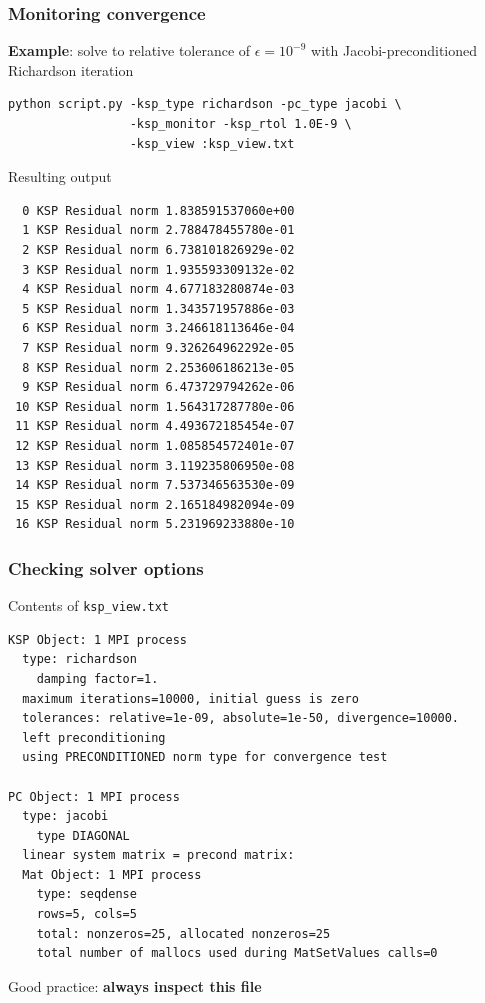 \documentclass{beamer}
\begin{document}
\begin{frame}[fragile]
  \frametitle{Monitoring convergence}
  \textbf{Example}: solve to relative tolerance of $\epsilon=10^{-9}$ with Jacobi-preconditioned Richardson iteration
  \begin{verbatim}
python script.py -ksp_type richardson -pc_type jacobi \
                 -ksp_monitor -ksp_rtol 1.0E-9 \
                 -ksp_view :ksp_view.txt    
  \end{verbatim}
Resulting output
{\tiny
\begin{verbatim}
  0 KSP Residual norm 1.838591537060e+00
  1 KSP Residual norm 2.788478455780e-01
  2 KSP Residual norm 6.738101826929e-02
  3 KSP Residual norm 1.935593309132e-02
  4 KSP Residual norm 4.677183280874e-03
  5 KSP Residual norm 1.343571957886e-03
  6 KSP Residual norm 3.246618113646e-04
  7 KSP Residual norm 9.326264962292e-05
  8 KSP Residual norm 2.253606186213e-05
  9 KSP Residual norm 6.473729794262e-06
 10 KSP Residual norm 1.564317287780e-06
 11 KSP Residual norm 4.493672185454e-07
 12 KSP Residual norm 1.085854572401e-07
 13 KSP Residual norm 3.119235806950e-08
 14 KSP Residual norm 7.537346563530e-09
 15 KSP Residual norm 2.165184982094e-09
 16 KSP Residual norm 5.231969233880e-10
\end{verbatim}}
\end{frame}


\begin{frame}[fragile]
  \frametitle{Checking solver options}
  Contents of \lstinline{ksp_view.txt}
{\footnotesize
\begin{verbatim}  
KSP Object: 1 MPI process
  type: richardson
    damping factor=1.
  maximum iterations=10000, initial guess is zero
  tolerances: relative=1e-09, absolute=1e-50, divergence=10000.
  left preconditioning
  using PRECONDITIONED norm type for convergence test

PC Object: 1 MPI process
  type: jacobi
    type DIAGONAL
  linear system matrix = precond matrix:
  Mat Object: 1 MPI process
    type: seqdense
    rows=5, cols=5
    total: nonzeros=25, allocated nonzeros=25
    total number of mallocs used during MatSetValues calls=0
\end{verbatim}}
Good practice: \textbf{always inspect this file}
\end{frame}

\end{document}
